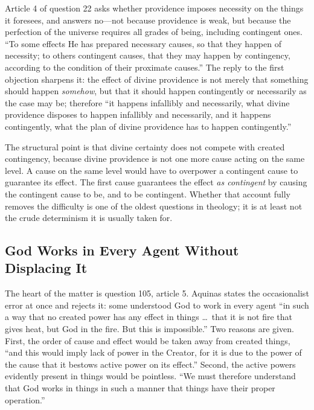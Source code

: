 Article 4 of question 22 asks whether providence imposes necessity on the things it foresees, and answers no---not because providence is weak, but because the perfection of the universe requires all grades of being, including contingent ones. ``To some effects He has prepared necessary causes, so that they happen of necessity; to others contingent causes, that they may happen by contingency, according to the condition of their proximate causes.'' The reply to the first objection sharpens it: the effect of divine providence is not merely that something should happen \emph{somehow}, but that it should happen contingently or necessarily as the case may be; therefore ``it happens infallibly and necessarily, what divine providence disposes to happen infallibly and necessarily, and it happens contingently, what the plan of divine providence has to happen contingently.''

The structural point is that divine certainty does not compete with created contingency, because divine providence is not one more cause acting on the same level. A cause on the same level would have to overpower a contingent cause to guarantee its effect. The first cause guarantees the effect \emph{as contingent} by causing the contingent cause to be, and to be contingent. Whether that account fully removes the difficulty is one of the oldest questions in theology; it is at least not the crude determinism it is usually taken for.

\subsection{God Works in Every Agent Without Displacing It}

The heart of the matter is question 105, article 5. Aquinas states the occasionalist error at once and rejects it: some understood God to work in every agent ``in such a way that no created power has any effect in things \ldots\ that it is not fire that gives heat, but God in the fire. But this is impossible.'' Two reasons are given. First, the order of cause and effect would be taken away from created things, ``and this would imply lack of power in the Creator, for it is due to the power of the cause that it bestows active power on its effect.'' Second, the active powers evidently present in things would be pointless. ``We must therefore understand that God works in things in such a manner that things have their proper operation.''

